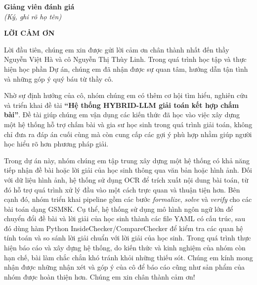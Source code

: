 \documentclass[12pt,a4paper]{article}
\begin{document}
\vspace{1cm}

\begin{flushright}
    \textbf{Giảng viên đánh giá}\\
    \textit{(Ký, ghi rõ họ tên)}
\end{flushright}


\newpage
\thispagestyle{empty}

\begin{center}
    {\Large \textbf{LỜI CẢM ƠN}}
\end{center}

\vspace{0.8cm}




Lời đầu tiên, chúng em xin được gửi lời cảm ơn chân thành nhất đến thầy Nguyễn Việt Hà và cô Nguyễn Thị Thùy Linh. 
Trong quá trình học tập và thực hiện học phần Dự án, chúng em đã nhận được sự quan tâm, 
hướng dẫn tận tình và những góp ý quý báu từ thầy cô.

Nhờ sự định hướng của cô, nhóm chúng em có thêm cơ hội tìm hiểu, nghiên cứu và triển khai đề tài 
\textbf{``Hệ thống HYBRID-LLM giải toán kết hợp chấm bài''}. 
Đề tài giúp chúng em vận dụng các kiến thức đã học vào việc xây dựng một hệ thống hỗ trợ chấm bài và gia sư học sinh trong quá trình giải toán, 
không chỉ đưa ra đáp án cuối cùng mà còn cung cấp các gợi ý phù hợp nhằm giúp người học hiểu rõ hơn phương pháp giải.

Trong dự án này, nhóm chúng em tập trung xây dựng một hệ thống có khả năng tiếp nhận đề bài hoặc lời giải của học sinh thông qua văn bản hoặc hình ảnh. Đối với dữ liệu hình ảnh, hệ thống sử dụng OCR để trích xuất nội dung bài toán, từ đó hỗ trợ quá trình xử lý đầu vào một cách trực quan và thuận tiện hơn. Bên cạnh đó, nhóm triển khai pipeline gồm các bước \textit{formalize}, \textit{solve} và \textit{verify} cho các bài toán dạng GSM8K. Cụ thể, hệ thống sử dụng mô hình ngôn ngữ lớn để chuyển đổi đề bài và lời giải của học sinh thành các file YAML có cấu trúc, sau đó dùng hàm Python InsideChecker/CompareChecker để kiểm tra các quan hệ tính toán và so sánh lời giải chuẩn với lời giải của học sinh. Trong quá trình thực hiện báo cáo và xây dựng hệ thống, do kiến thức và kinh nghiệm của nhóm còn hạn chế, bài làm chắc chắn khó tránh khỏi những thiếu sót. Chúng em kính mong nhận được những nhận xét và góp ý của cô để báo cáo cũng như sản phẩm của nhóm được hoàn thiện hơn. 
Chúng em xin chân thành cảm ơn!
\end{document}
